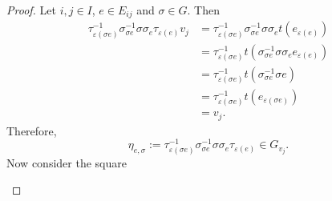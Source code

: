 \documentclass[a4paper,12pt,reqno]{amsart}
\theoremstyle{plain}
\theoremstyle{remark}
\begin{document}
  \begin{proof}
    Let $i,j\in I$, $e\in E_{ij}$ and $\sigma\in G$. Then
    \begin{align*}
      \tau_{\varepsilon(\sigma e)}^{-1}\sigma_{\sigma e}^{-1}\sigma\sigma_e\tau_{\varepsilon(e)}v_j
      &=
      \tau_{\varepsilon(\sigma e)}^{-1}\sigma_{\sigma e}^{-1}\sigma\sigma_et(e_{\varepsilon(e)})\\
      &=
      \tau_{\varepsilon(\sigma e)}^{-1}t(\sigma_{\sigma e}^{-1}\sigma\sigma_ee_{\varepsilon(e)})\\
      &=
      \tau_{\varepsilon(\sigma e)}^{-1}t(\sigma_{\sigma e}^{-1}\sigma e)\\
      &=
      \tau_{\varepsilon(\sigma e)}^{-1}t(e_{\varepsilon(\sigma e)})\\
      &=
      v_j.
    \end{align*}
    Therefore,
    \[
          \eta_{e,\sigma}:=\tau_{\varepsilon(\sigma e)}^{-1}\sigma_{\sigma e}^{-1}\sigma\sigma_e\tau_{\varepsilon(e)}\in G_{v_j}.
    \]
    Now consider the square
    \begin{center}
\end{center}
\end{proof}
\end{document}
